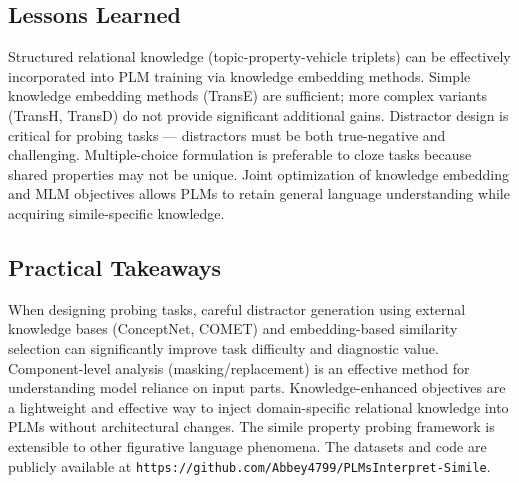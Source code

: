 \documentclass[12pt]{article}
\begin{document}
\subsection{Lessons Learned}

Structured relational knowledge (topic-property-vehicle triplets) can be effectively incorporated into PLM training via knowledge embedding methods. Simple knowledge embedding methods (TransE) are sufficient; more complex variants (TransH, TransD) do not provide significant additional gains. Distractor design is critical for probing tasks --- distractors must be both true-negative and challenging. Multiple-choice formulation is preferable to cloze tasks because shared properties may not be unique. Joint optimization of knowledge embedding and MLM objectives allows PLMs to retain general language understanding while acquiring simile-specific knowledge.

\subsection{Practical Takeaways}

When designing probing tasks, careful distractor generation using external knowledge bases (ConceptNet, COMET) and embedding-based similarity selection can significantly improve task difficulty and diagnostic value. Component-level analysis (masking/replacement) is an effective method for understanding model reliance on input parts. Knowledge-enhanced objectives are a lightweight and effective way to inject domain-specific relational knowledge into PLMs without architectural changes. The simile property probing framework is extensible to other figurative language phenomena. The datasets and code are publicly available at \texttt{https://github.com/Abbey4799/PLMsInterpret-Simile}.
\end{document}
